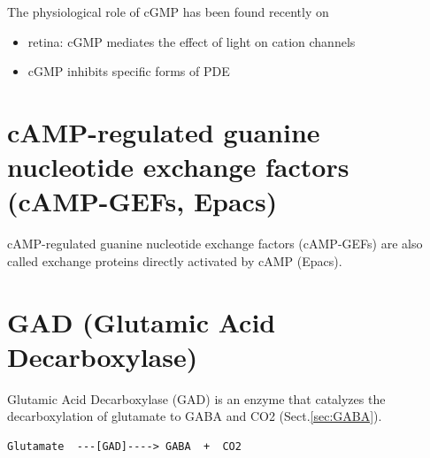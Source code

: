 The physiological role of cGMP has been found recently on
\begin{itemize}
  \item retina: cGMP mediates the effect of light on cation channels
  \item cGMP inhibits specific forms of PDE
\end{itemize}




\section{cAMP-regulated guanine nucleotide exchange factors (cAMP-GEFs, Epacs)}
\label{sec:cAMP-GEF}
\label{sec:Epacs}

cAMP-regulated guanine nucleotide exchange factors (cAMP-GEFs) are also called
exchange proteins directly activated by cAMP (Epacs).



\section{GAD (Glutamic Acid Decarboxylase)}
\label{sec:GAD}
\label{sec:GAD-enzyme}

Glutamic Acid Decarboxylase (GAD) is an enzyme that catalyzes the
decarboxylation of glutamate to GABA and CO2 (Sect.\ref{sec:GABA}).

\begin{verbatim}
Glutamate  ---[GAD]----> GABA  +  CO2
\end{verbatim}

